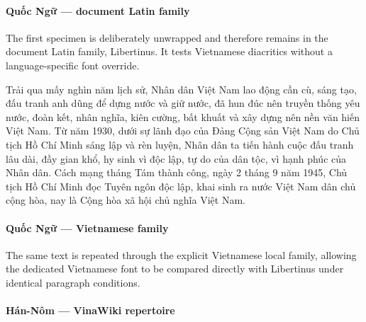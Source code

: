 \paragraph{Quốc Ngữ --- document Latin family}

The first specimen is deliberately unwrapped and therefore remains in the
document Latin family, Libertinus. It tests Vietnamese diacritics without a
language-specific font override.

Trải qua mấy nghìn năm lịch sử, Nhân dân Việt Nam lao động cần cù, sáng tạo, đấu tranh anh dũng để dựng nước và giữ nước, đã hun đúc nên truyền thống yêu nước, đoàn kết, nhân nghĩa, kiên cường, bất khuất và xây dựng nên nền văn hiến Việt Nam. Từ năm 1930, dưới sự lãnh đạo của Đảng Cộng sản Việt Nam do Chủ tịch Hồ Chí Minh sáng lập và rèn luyện, Nhân dân ta tiến hành cuộc đấu tranh lâu dài, đầy gian khổ, hy sinh vì độc lập, tự do của dân tộc, vì hạnh phúc của Nhân dân. Cách mạng tháng Tám thành công, ngày 2 tháng 9 năm 1945, Chủ tịch Hồ Chí Minh đọc Tuyên ngôn độc lập, khai sinh ra nước Việt Nam dân chủ cộng hòa, nay là Cộng hòa xã hội chủ nghĩa Việt Nam.


\paragraph{Quốc Ngữ --- Vietnamese family}

The same text is repeated through the explicit Vietnamese local family,
allowing the dedicated Vietnamese font to be compared directly with
Libertinus under identical paragraph conditions.



\paragraph{Hán-Nôm --- VinaWiki repertoire}

